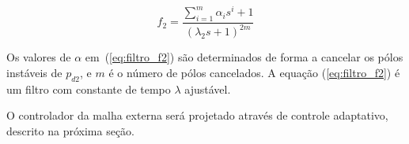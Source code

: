   \begin{equation}
    f_2 = \frac{\sum_{i=1}^{m}
    	\alpha_i s^i + 1}{(\lambda_2 s + 1)^{2m}}
    \label{eq:filtro_f2}
  \end{equation}

  Os valores de $\alpha$ em~(\ref{eq:filtro_f2}) são determinados de forma a cancelar os pólos instáveis de $p_{d2}$, e $m$ é o número de pólos cancelados. A equação (\ref{eq:filtro_f2}) é um filtro com constante de tempo $\lambda$ ajustável.

  O controlador da malha externa será projetado através de controle adaptativo, descrito na próxima seção.


